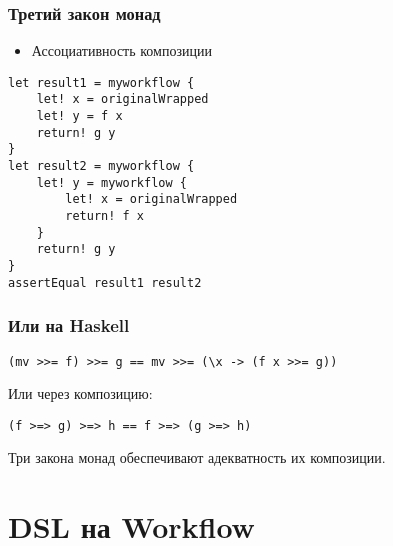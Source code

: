 \documentclass{../../slides-style}
\begin{document}
    \begin{frame}[fragile]
        \frametitle{Третий закон монад}
        \begin{itemize}
            \item Ассоциативность композиции
        \end{itemize}
        \begin{verbatim}
let result1 = myworkflow { 
    let! x = originalWrapped
    let! y = f x 
    return! g y  
}
let result2 = myworkflow { 
    let! y = myworkflow { 
        let! x = originalWrapped
        return! f x
    }
    return! g y
}
assertEqual result1 result2
        \end{verbatim}
    \end{frame}

    \begin{frame}[fragile]
        \frametitle{Или на Haskell}
        \begin{verbatim}
(mv >>= f) >>= g == mv >>= (\x -> (f x >>= g))
        \end{verbatim}
        \vspace{5mm}
        Или через композицию:
        \begin{verbatim}
(f >=> g) >=> h == f >=> (g >=> h)
        \end{verbatim}
        \vspace{5mm}

        Три закона монад обеспечивают адекватность их композиции.
    \end{frame}

    \section{DSL на Workflow}
\end{document}
